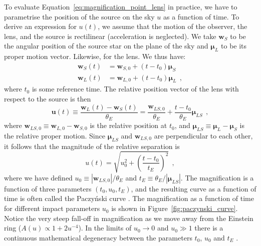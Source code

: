 \documentclass[12pt,dvipsnames]{report}
\renewcommand{\vec}[1]{\boldsymbol{\mathbf{#1}}}
\newcommand{\hquad}{~~}
\begin{document}
To evaluate Equation~\ref{eq:magnification_point_lens} in practice,
we have to parametrise the position of the source on the sky $u$ as a function
of time. To derive an expression for $u(t)$, we assume that the motion of the
observer, the lens, and the source is rectilinear (acceleration is neglected).
We take $\vec{w}_S$ to be the angular position of the source star on the plane
of the sky and $\boldsymbol{\mu}_L$ to be its proper motion vector. Likewise,
for the lens. We thus have:
\begin{align}
    \vec{w}_S(t) & =\vec{w}_{S, 0}+
    \left(t-t_{0}\right) \boldsymbol{\mu}_S
    \label{eq:source_position}      \\
    \vec{w}_L(t) & =\vec{w}_{L, 0}
    +\left(t-t_{0}\right) \boldsymbol{\mu}_L
    \hquad,
    \label{eq:lens_position}
\end{align}
where $t_0$ is some reference time.
The relative position vector of the lens with respect to the source is then
\begin{equation}
    \boldsymbol{u}(t) \equiv \frac{\vec{w}_L(t)
        -\vec{w}_S(t)}{\theta_E}=
    \frac{\vec{w}_{LS, 0}}{\theta_E}
    +\frac{t-t_{0}}{\theta_E} \boldsymbol{\mu}_{LS}
    \hquad,
    \label{eq:relative_trajectory_no_parallax}
\end{equation}
where
$\vec{w}_{L S, 0}\equiv\vec{w}_{L,0}-\vec{w}_{S, 0}$
is the relative position at $t_0$, and
$\boldsymbol{\mu}_{LS}\equiv \boldsymbol{\mu}_{L}- \boldsymbol{\mu}_{S}$ is the
relative proper motion.
Since $\boldsymbol{\mu}_{LS}$ and $\vec{w}_{L S, 0}$ are
perpendicular to each other, it follows that the magnitude of the relative
separation is
\begin{equation}
    u(t)=\sqrt{u_0^2+ \left(\frac{t-t_0}{t_E}\right)^2}
    \hquad,
\end{equation}
where we have defined $u_0\equiv |\vec{w}_{L S, 0}|/\theta_E$
and $t_E\equiv \theta_E/|\boldsymbol{\mu}_{LS}|$.
The magnification is a function of three parameters $(t_0, u_0, t_E)$,
and the resulting curve as a function of time is often called the Paczy\'nski curve
\citep{1986ApJ...304....1P,1986ApJ...301..503P}.
The magnification as a function of time for different impact parameters $u_0$
is shown in Figure~\ref{fig:paczynski_curve}. Notice the very steep fall-off in
magnification as we move away from the Einstein ring ($A(u)\propto
    1+2u^{-4}$).
In the limits of $u_0\rightarrow 0$ and $u_0\gg 1$  there is a continuous
mathematical degeneracy between the parameters $t_0$, $u_0$ and $t_E$
\citep{1997ApJ...487...55W}.
\end{document}
